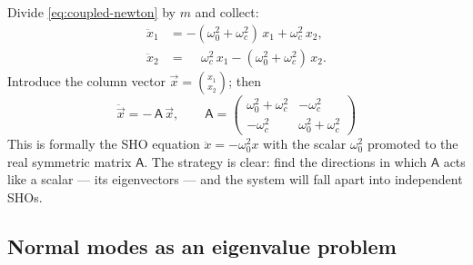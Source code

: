 \documentclass[11pt]{article}
\theoremstyle{plain}
\theoremstyle{definition}
\theoremstyle{remark}
\newcommand{\vx}{\vec{x}}
\newcommand{\mA}{\mathsf{A}}
\begin{document}
Divide \eqref{eq:coupled-newton} by $m$ and collect:
\begin{align}
  \ddot x_1 &= -(\omega_0^2 + \omega_c^2)\, x_1 + \omega_c^2\, x_2, \nonumber\\
  \ddot x_2 &= \phantom{-(}\omega_c^2\, x_1 - (\omega_0^2+\omega_c^2)\, x_2 .
\end{align}
Introduce the column vector $\vx = \binom{x_1}{x_2}$; then
\begin{equation}
  \boxed{\;
  \ddot\vx = -\,\mA\,\vx,
  \qquad
  \mA =
  \begin{pmatrix}
    \omega_0^2 + \omega_c^2 & -\omega_c^2 \\
    -\omega_c^2 & \omega_0^2 + \omega_c^2
  \end{pmatrix}
  \;}
  \label{eq:coupled-matrix}
\end{equation}
This is formally the SHO equation $\ddot x = -\omega_0^2 x$ with the scalar
$\omega_0^2$ promoted to the real symmetric matrix $\mA$. The strategy is
clear: find the directions in which $\mA$ acts like a scalar ---
its eigenvectors --- and the system will fall apart into independent SHOs.

\subsection{Normal modes as an eigenvalue problem}
\end{document}
